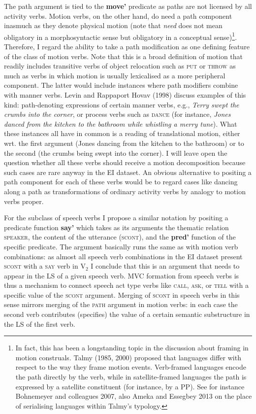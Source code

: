 The path argument is tied to the \textbf{move'} predicate as paths are not licensed by all activity verbs. Motion verbs, on the other hand, do need a path component inasmuch as they denote physical motion (note that \emph{need} does not mean obligatory in a morphosyntactic sense but obligatory in a conceptual sense)\footnote{In fact, this has been a longstanding topic in the discussion about framing in motion construals. Talmy (1985, 2000) proposed that languages differ with respect to the way they frame motion events. Verb-framed languages encode the path directly by the verb, while in satellite-framed languages the path is expressed by a satellite constituent (for instance, by a PP). See for instance Bohnemeyer and colleagues 2007, also Ameka and Essegbey 2013 on the place of serialising languages within Talmy's typology.}. Therefore, I regard the ability to take a path modification as one defining feature of the class of motion verbs. Note that this is a broad definition of motion that readily includes transitive verbs of object relocation such as \textsc{put} or \textsc{throw} as much as verbs in which motion is usually lexicalised as a more peripheral component. The latter would include instances where path modifiers combine with manner verbs. Levin and Rappaport Hovav (1998) discuss examples of this kind: path-denoting expressions of certain manner verbs, e.g., \textit{Terry swept the crumbs into the corner}, or process verbs such as \textsc{dance} (for instance, \textit{Jones danced from the kitchen to the bathroom while whistling a merry tune}). What these instances all have in common is a reading of translational motion, either wrt. the first argument (Jones dancing from the kitchen to the bathroom) or to the second (the crumbs being swept into the corner). I will leave open the question whether all these verbs should receive a motion decomposition because such cases are rare anyway in the EI dataset. An obvious alternative to positing a path component for each of these verbs would be to regard cases like dancing along a path as transformations of ordinary activity verbs by analogy to motion verbs proper.

For the subclass of speech verbs I propose a similar notation by positing a predicate function \textbf{say'} which takes as its arguments the thematic relation \textsc{speaker}, the content of the utterance (\textsc{scont}), and the \textbf{pred'} function of the specific predicate. The argument basically runs the same as with motion verb combinations: as almost all speech verb combinations in the EI dataset present \textsc{scont} with a \textsc{say} verb in V$_2$ I conclude that this is an argument that needs to appear in the LS of a given speech verb. MVC formation from speech verbs is thus a mechanism to connect speech act type verbs like \textsc{call}, \textsc{ask}, or \textsc{tell} with a specific value of the \textsc{scont} argument. Merging of \textsc{scont} in speech verbs in this sense mirrors merging of the \textsc{path} argument in motion verbs: in each case the second verb contributes (specifies) the value of a certain semantic substructure in the LS of the first verb.

